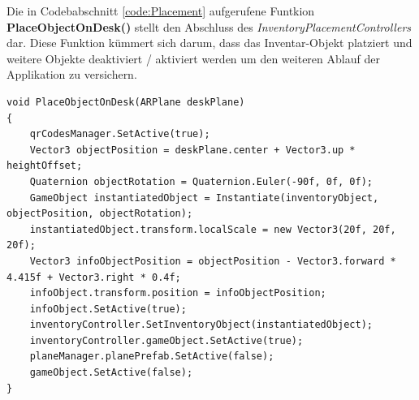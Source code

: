 Die in Codebabschnitt \ref{code:Placement} aufgerufene Funtkion \textbf{PlaceObjectOnDesk()} stellt den Abschluss des
\textit{InventoryPlacementControllers} dar. Diese Funktion kümmert sich darum, dass das Inventar-Objekt platziert und
weitere Objekte deaktiviert / aktiviert werden um den weiteren Ablauf der Applikation zu versichern.

\begin{lstlisting}[style=csharp, caption={Inventar platzier - Funktion}, label=code:placeobject]
void PlaceObjectOnDesk(ARPlane deskPlane)
{
    qrCodesManager.SetActive(true);
    Vector3 objectPosition = deskPlane.center + Vector3.up * heightOffset;
    Quaternion objectRotation = Quaternion.Euler(-90f, 0f, 0f);
    GameObject instantiatedObject = Instantiate(inventoryObject, objectPosition, objectRotation);
    instantiatedObject.transform.localScale = new Vector3(20f, 20f, 20f);
    Vector3 infoObjectPosition = objectPosition - Vector3.forward * 4.415f + Vector3.right * 0.4f;
    infoObject.transform.position = infoObjectPosition;
    infoObject.SetActive(true);
    inventoryController.SetInventoryObject(instantiatedObject);
    inventoryController.gameObject.SetActive(true);
    planeManager.planePrefab.SetActive(false);
    gameObject.SetActive(false);
}
\end{lstlisting}

